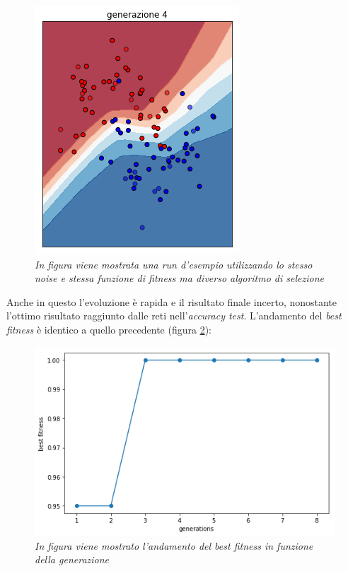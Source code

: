 \documentclass[12pt,a4paper]{report}
\begin{document}
\begin{figure}[H]
 \includegraphics[scale = 0.35]{images/moons-sons-acc./4}
 \caption{\textit{In figura viene mostrata una run d'esempio utilizzando lo stesso noise e stessa funzione di fitness ma diverso algoritmo di selezione}}
 \label{moons2}
\end{figure}

Anche in questo l'evoluzione è rapida e il risultato finale incerto, nonostante l'ottimo risultato raggiunto dalle reti nell'\textit{accuracy test}. L'andamento del \textit{best fitness} è identico a quello precedente (figura \ref{best2}):

\begin{figure}[H]
 \centering
 \includegraphics[scale = 0.4]{images/moons-sons-acc./best}
 \caption{\textit{In figura viene mostrato l'andamento del best fitness in funzione della generazione}}
 \label{best2}
\end{figure}
\end{document}
